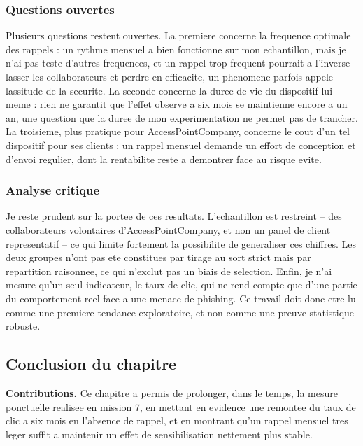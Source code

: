 \documentclass[11pt,a4paper]{article}
\begin{document}
\subsubsection*{Questions ouvertes}

Plusieurs questions restent ouvertes. La premiere concerne la frequence optimale des rappels : un rythme mensuel a bien fonctionne sur mon echantillon, mais je n'ai pas teste d'autres frequences, et un rappel trop frequent pourrait a l'inverse lasser les collaborateurs et perdre en efficacite, un phenomene parfois appele lassitude de la securite. La seconde concerne la duree de vie du dispositif lui-meme : rien ne garantit que l'effet observe a six mois se maintienne encore a un an, une question que la duree de mon experimentation ne permet pas de trancher. La troisieme, plus pratique pour AccessPointCompany, concerne le cout d'un tel dispositif pour ses clients : un rappel mensuel demande un effort de conception et d'envoi regulier, dont la rentabilite reste a demontrer face au risque evite.

\subsubsection*{Analyse critique}

Je reste prudent sur la portee de ces resultats. L'echantillon est restreint -- des collaborateurs volontaires d'AccessPointCompany, et non un panel de client representatif -- ce qui limite fortement la possibilite de generaliser ces chiffres. Les deux groupes n'ont pas ete constitues par tirage au sort strict mais par repartition raisonnee, ce qui n'exclut pas un biais de selection. Enfin, je n'ai mesure qu'un seul indicateur, le taux de clic, qui ne rend compte que d'une partie du comportement reel face a une menace de phishing. Ce travail doit donc etre lu comme une premiere tendance exploratoire, et non comme une preuve statistique robuste.

\subsection{Conclusion du chapitre}

\textbf{Contributions.} Ce chapitre a permis de prolonger, dans le temps, la mesure ponctuelle realisee en mission 7, en mettant en evidence une remontee du taux de clic a six mois en l'absence de rappel, et en montrant qu'un rappel mensuel tres leger suffit a maintenir un effet de sensibilisation nettement plus stable.
\end{document}
